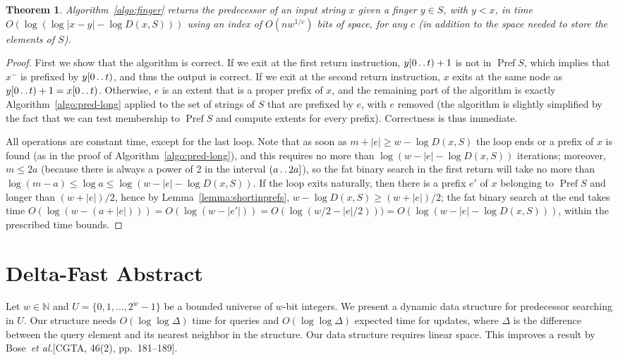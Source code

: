 \documentclass[a4paper,11pt]{article}
\newtheorem{theorem} {Theorem}[section]
\newcommand{\N}{\mathbb{N}}
\newcommand{\etal}{\emph{et al.}\xspace}
\newcommand{\?}{\mskip1.5mu}
\def\..{\,\mathpunct{\ldotp\ldotp}} %
\DeclareMathOperator{\Pref}{Pref}
\begin{document}
\begin{theorem}
\label{th:finger}
Algorithm~\ref{algo:finger} returns the predecessor of an input string $x$ given
a finger $y\in S$, with $y<x$, in time $O(\log(\log|x-y|-\log D(x,S)))$ using an 
index of $O(n w^{1/c})$ bits 
of space, for any $c$ (in addition to the space needed to store the elements of $S$).
\end{theorem}
\begin{proof}
First we show that the algorithm is correct. 
If we exit at the first return instruction, $y[0\..t)+1$ is
not in $\Pref S$, which implies that $x^-$ is prefixed by $y[0\..t)$, and thus
the output is correct. If we exit at the second return instruction, $x$
exits at the same node as $y[0\..t)+1=x[0\..t)$. Otherwise, $e$ is an extent
that is a proper prefix of $x$, and the remaining part of the algorithm
is exactly Algorithm~\ref{algo:pred-long} applied to the set of strings of $S$ 
that are prefixed by $e$, with $e$ removed (the algorithm is slightly
simplified by the fact that we can test membership to $\Pref S$ and compute
extents for every prefix). Correctness is thus immediate.

All operations are constant time, except for the last loop. Note that as soon as
$m+|e|\geq w-\log D(x,S)$ the loop ends or a prefix of $x$ is found (as in the
proof of Algorithm~\ref{algo:pred-long}), and this requires no more than $\log(w-|e|-\log
D(x,S))$ iterations; moreover, $m\leq 2a$ (because there is always
a power of 2 in the interval $(a\..2a]$), so the fat binary search in the first
return will take no more than $\log(m-a)\leq \log a\leq \log (w-|e|-\log D(x,S))$.
If the loop exits naturally, then there is a prefix $e'$ of $x$ belonging
to $\Pref S$ and longer than $(w+|e|)/2$, hence by
Lemma~\ref{lemma:shortinprefs}, $w-\log D(x,S)\geq (w+|e|)/2$; the fat binary search at the
end takes time $O(\log (w-(a+|e|)))=O(\log (w-|e'|))=O(\log( w/2 -
|e|/2)))=O(\log(w-|e|-\log D(x,S)))$, within the prescribed time bounds.
\end{proof}

\section{Delta-Fast Abstract}
Let $w \in \N$ and $U = \{0, 1, \dots, 2^w-1\}$ be a 
bounded universe of $w$-bit integers.  We present a 
dynamic data structure for predecessor searching in 
$U$.  Our structure needs $O(\log \log \Delta)$ time 
for queries and $O(\log \log \Delta)$ expected time 
for updates, where $\Delta$ is the difference between 
the query element and its nearest neighbor in the 
structure. Our data structure requires linear space. 
This improves a result by Bose~\etal [CGTA, 46(2), pp.~181--189].
\end{document}
